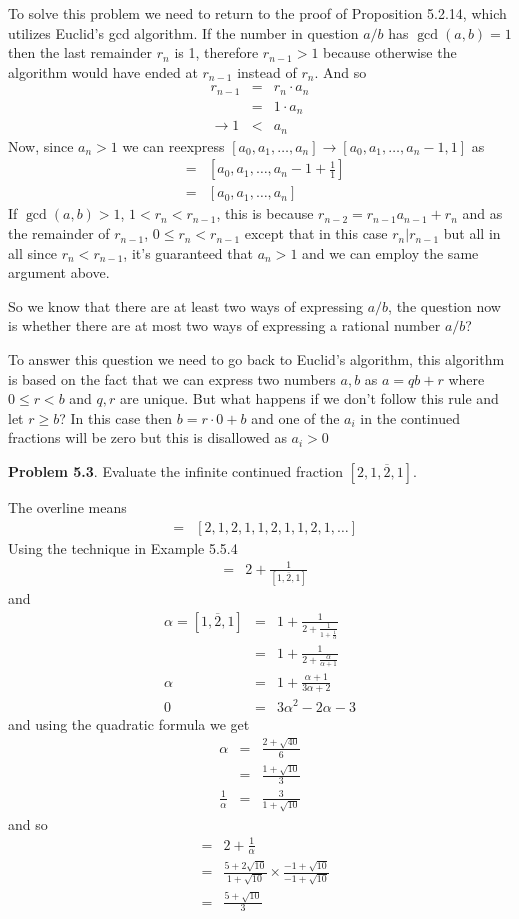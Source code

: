 \documentclass[aps,preprint,preprintnumbers,nofootinbib,showpacs,prd]{revtex4-1}
\newcommand{\nbea}{\begin{eqnarray*}}
\newcommand{\neea}{\end{eqnarray*}}
\begin{document}
To solve this problem we need to return to the proof of Proposition 5.2.14, which utilizes Euclid's gcd algorithm. If the number in question $a/b$ has $\gcd(a,b)=1$ then the last remainder $r_n$ is 1, therefore $r_{n-1} > 1$ because otherwise the algorithm would have ended at $r_{n-1}$ instead of $r_n$. And so
%
\nbea
r_{n-1} & = & r_n \cdot a_n \\
& = & 1 \cdot a_n \\
\to 1 & < & a_n
\neea
%
Now, since $a_n > 1$ we can reexpress $[a_0, a_1, \dots, a_n] \to [a_0, a_1, \dots, a_n-1, 1]$ as
%
\nbea
[a_0, a_1, \dots, a_n-1, 1] & = &  [a_0, a_1, \dots, a_n-1 + \frac{1}{1}] \\
& = & [a_0, a_1, \dots, a_n]
\neea
%
If $\gcd(a,b) > 1$, $1 < r_n < r_{n-1}$, this is because $r_{n-2} = r_{n-1}a_{n-1} + r_n$ and as the remainder of $r_{n-1}$, $0 \le r_n < r_{n-1}$ except that in this case $r_n | r_{n-1}$ but all in all since $r_n < r_{n-1}$, it's guaranteed that $a_n > 1$ and we can employ the same argument above.

So we know that there are at least two ways of expressing $a/b$, the question now is whether there are at most two ways of expressing a rational number $a/b$?

To answer this question we need to go back to Euclid's algorithm, this algorithm is based on the fact that we can express two numbers $a,b$ as $a = qb + r$ where $0 \le r < b$ and $q,r$ are unique. But what happens if we don't follow this rule and let $r \ge b$? In this case then $b = r\cdot 0 + b$ and one of the $a_i$ in the continued fractions will be zero but this is disallowed as $a_i > 0$

{\bf Problem 5.3}. Evaluate the inﬁnite continued fraction $[2, \overline{1, 2, 1}]$.

The overline means
%
\nbea
[2, \overline{1, 2, 1}] & = & [2, 1, 2, 1, 1, 2, 1, 1, 2, 1, \dots]
\neea
%
Using the technique in Example 5.5.4
%
\nbea
[2, \overline{1, 2, 1}] & = & 2 + \frac{1}{[\overline{1, 2, 1}] }
\neea
%
and
%
\nbea
\alpha = [\overline{1, 2, 1}] & = & 1 + \frac{1}{2 + \frac{1}{1 + \frac{1}{\alpha}}} \\
& = & 1 + \frac{1}{2 + \frac{\alpha}{\alpha + 1}} \\
\alpha & = & 1 + \frac{\alpha + 1}{3 \alpha + 2} \\
0 & = & 3\alpha^2 - 2\alpha-3
\neea
%
and using the quadratic formula we get
%
\nbea
\alpha & = & \frac{2+\sqrt{40}}{6} \\
& = & \frac{1+\sqrt{10}}{3} \\
\frac{1}{\alpha} & = & \frac{3}{1 + \sqrt{10}}
\neea
%
and so
%
\nbea
[2, \overline{1, 2, 1}] & = & 2 + \frac{1}{\alpha} \\
& = & \frac{5 + 2\sqrt{10}}{1 + \sqrt{10}} \times \frac{-1 + \sqrt{10}}{-1 + \sqrt{10}} \\
& = & \frac{5 +\sqrt{10}}{3}
\neea
%
\end{document}
